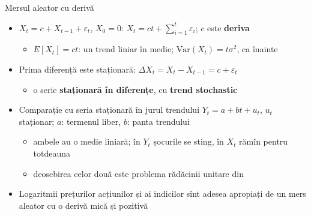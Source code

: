 \begin{frame}{Mersul aleator cu derivă}
\itemsize{\small}
\begin{itemize}
    \item $X_t = c + X_{t-1} + \varepsilon_t$, $X_0 = 0$: $X_t = ct + \sum_{i=1}^{t}\varepsilon_i$; $c$ este \textbf{deriva}
    \begin{itemize}
        \item $E[X_t] = ct$: un trend liniar în medie; $\mathrm{Var}(X_t) = t\sigma^2$, ca înainte
    \end{itemize}
    \item Prima diferență este staționară: $\Delta X_t = X_t - X_{t-1} = c + \varepsilon_t$
    \begin{itemize}
        \item o serie \textbf{staționară în diferențe}, cu \textbf{trend stochastic}
    \end{itemize}
    \item Comparație cu seria staționară în jurul trendului $Y_t = a + bt + u_t$, $u_t$ staționar; $a$: termenul liber, $b$: panta trendului
    \begin{itemize}
        \item ambele au o medie liniară; în $Y_t$ șocurile se sting, în $X_t$ rămîn pentru totdeauna
        \item deosebirea celor două este problema rădăcinii unitare din 
    \end{itemize}
    \item Logaritmii prețurilor acțiunilor și ai indicilor sînt adesea apropiați de un mers aleator cu o derivă mică și pozitivă
\end{itemize}
\end{frame}

